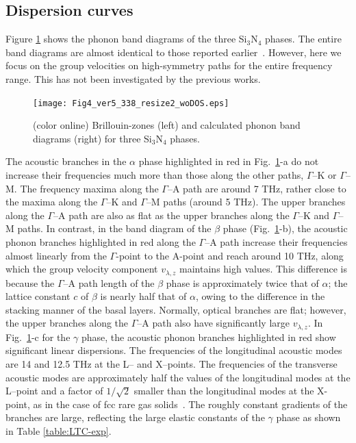 \documentclass[twocolumn,amsmath,amssymb,a4paper,prb,superscriptaddress,floatfix]{revtex4-1}
\begin{document}
\subsection{Dispersion curves}

Figure \ref{fig:Fig4_ver5_338} shows the phonon band diagrams of the three
Si$_3$N$_4$ phases. The entire band diagrams are almost identical to those
reported earlier~\cite{kuwabara,xu}. However, here we focus on the group
velocities on high-symmetry paths for the entire frequency range. This has not
been investigated by the previous works.

\begin{figure}[ht]
 \begin{center}
  \texttt{[image: Fig4\_ver5\_338\_resize2\_woDOS.eps]}
  \caption{(color online) Brillouin-zones (left) and calculated phonon band diagrams (right) for three Si$_3$N$_4$ phases.
  \label{fig:Fig4_ver5_338} }
 \end{center}
\end{figure}

The acoustic branches in the $\alpha$ phase highlighted in red in
Fig.~\ref{fig:Fig4_ver5_338}-a do not increase their frequencies much more than
those along the other paths, $\Gamma$--K or $\Gamma$--M. The frequency maxima
along the $\Gamma$--A path are around 7 THz, rather close to the maxima along
the $\Gamma$--K and $\Gamma$--M paths (around 5 THz). The upper branches along
the $\Gamma$--A path are also as flat as the upper branches along the
$\Gamma$--K and $\Gamma$--M paths.  In contrast, in the band diagram of the
$\beta$ phase (Fig.~\ref{fig:Fig4_ver5_338}-b), the acoustic phonon branches
highlighted in red along the $\Gamma$--A path increase their frequencies almost
linearly from the $\Gamma$-point to the A-point and reach around 10 THz, along
which the group velocity component $v_{\lambda,z}$ maintains high values. This
difference is because the $\Gamma$--A path length of the $\beta$ phase is
approximately twice that of $\alpha$; the lattice constant $c$ of $\beta$ is
nearly half that of $\alpha$, owing to the difference in the stacking manner of
the basal layers. Normally, optical branches are flat; however, the upper
branches along the $\Gamma$--A path also have significantly large
${v}_{\lambda,z}$.  In Fig.~\ref{fig:Fig4_ver5_338}-c for the $\gamma$
phase, the acoustic phonon branches highlighted in red show significant linear
dispersions. The frequencies of the longitudinal acoustic modes are 14 and 12.5
THz at the L-- and X--points. The frequencies of the transverse acoustic modes
are approximately half the values of the longitudinal modes at the L--point and
a factor of $1/\sqrt{2}$ smaller than the longitudinal modes at the X-point, as
in the case of fcc rare gas solids~\cite{dove-p30}. The roughly constant
gradients of the branches are large, reflecting the large elastic constants of
the $\gamma$ phase as shown in Table \ref{table:LTC-exp}.
\end{document}

